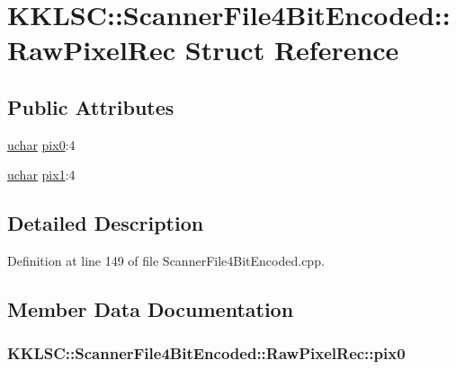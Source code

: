 \hypertarget{struct_scanner_file4_bit_encoded_1_1_raw_pixel_rec}{}\section{K\+K\+L\+SC\+:\+:Scanner\+File4\+Bit\+Encoded\+:\+:Raw\+Pixel\+Rec Struct Reference}
\label{struct_scanner_file4_bit_encoded_1_1_raw_pixel_rec}
\subsection*{Public Attributes}
\begin{DoxyCompactItemize}
\item 
\hyperlink{namespace_k_k_b_ace9969169bf514f9ee6185186949cdf7}{uchar} \hyperlink{struct_scanner_file4_bit_encoded_1_1_raw_pixel_rec_a092b412d347efa7bc4291cf16332b324}{pix0}\+:4
\item 
\hyperlink{namespace_k_k_b_ace9969169bf514f9ee6185186949cdf7}{uchar} \hyperlink{struct_scanner_file4_bit_encoded_1_1_raw_pixel_rec_a78d43582be2d3f1def955dda2c585b07}{pix1}\+:4
\end{DoxyCompactItemize}


\subsection{Detailed Description}


Definition at line 149 of file Scanner\+File4\+Bit\+Encoded.\+cpp.



\subsection{Member Data Documentation}
\subsubsection[{\texorpdfstring{pix0}{pix0}}]{ K\+K\+L\+S\+C\+::\+Scanner\+File4\+Bit\+Encoded\+::\+Raw\+Pixel\+Rec\+::pix0}\hypertarget{struct_scanner_file4_bit_encoded_1_1_raw_pixel_rec_a092b412d347efa7bc4291cf16332b324}{}\label{struct_scanner_file4_bit_encoded_1_1_raw_pixel_rec_a092b412d347efa7bc4291cf16332b324}


